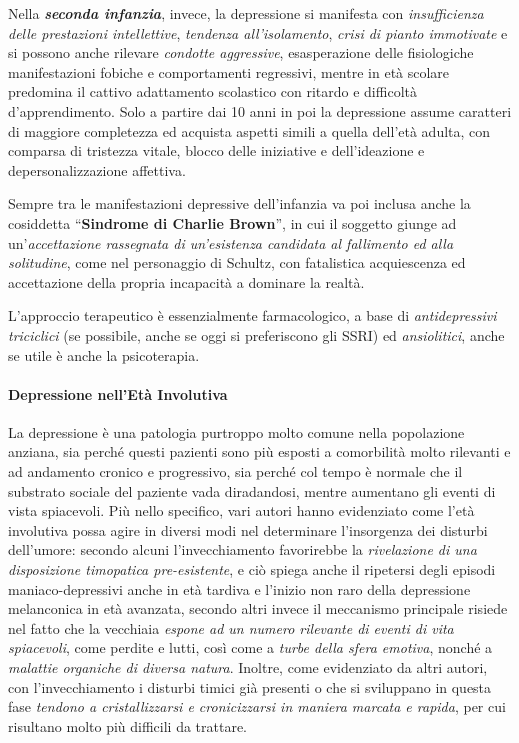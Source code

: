 Nella \textbf{\emph{seconda infanzia}}, invece, la depressione si
manifesta con \emph{insufficienza delle prestazioni intellettive},
\emph{tendenza all'isolamento}, \emph{crisi di pianto immotivate} e si
possono anche rilevare \emph{condotte aggressive}, esasperazione delle
fisiologiche manifestazioni fobiche e comportamenti regressivi, mentre
in età scolare predomina il cattivo adattamento scolastico con ritardo e
difficoltà d'apprendimento. Solo a partire dai 10 anni in poi la
depressione assume caratteri di maggiore completezza ed acquista aspetti
simili a quella dell'età adulta, con comparsa di tristezza vitale,
blocco delle iniziative e dell'ideazione e depersonalizzazione
affettiva.

Sempre tra le manifestazioni depressive dell'infanzia va poi inclusa
anche la cosiddetta ``\textbf{Sindrome di Charlie Brown}'', in cui il
soggetto giunge ad un'\emph{accettazione rassegnata di un'esistenza
candidata al fallimento ed alla solitudine}, come nel personaggio di
Schultz, con fatalistica acquiescenza ed accettazione della propria
incapacità a dominare la realtà.

L'approccio terapeutico è essenzialmente farmacologico, a base di
\emph{antidepressivi triciclici} (se possibile, anche se oggi si
preferiscono gli SSRI) ed \emph{ansiolitici}, anche se utile è anche la
psicoterapia.

\paragraph{Depressione nell'Età Involutiva}

La depressione è una patologia purtroppo molto comune nella popolazione
anziana, sia perché questi pazienti sono più esposti a comorbilità molto
rilevanti e ad andamento cronico e progressivo, sia perché col tempo è
normale che il substrato sociale del paziente vada diradandosi, mentre
aumentano gli eventi di vista spiacevoli. Più nello specifico, vari
autori hanno evidenziato come l'età involutiva possa agire in diversi
modi nel determinare l'insorgenza dei disturbi dell'umore: secondo
alcuni l'invecchiamento favorirebbe la \emph{rivelazione di una
disposizione timopatica pre-esistente}, e ciò spiega anche il ripetersi
degli episodi maniaco-depressivi anche in età tardiva e l'inizio non
raro della depressione melanconica in età avanzata, secondo altri invece
il meccanismo principale risiede nel fatto che la vecchiaia \emph{espone
ad un numero rilevante di eventi di vita spiacevoli}, come perdite e
lutti, così come a \emph{turbe della sfera emotiva}, nonché a
\emph{malattie organiche di diversa natura}. Inoltre, come evidenziato
da altri autori, con l'invecchiamento i disturbi timici già presenti o
che si sviluppano in questa fase \emph{tendono a cristallizzarsi e
cronicizzarsi in maniera marcata e rapida}, per cui risultano molto più
difficili da trattare.


